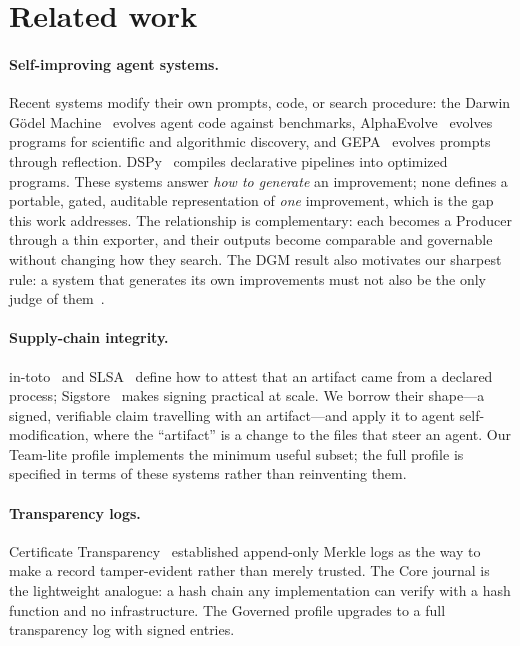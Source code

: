 \documentclass[10pt,twocolumn]{article}
\begin{document}
\section{Related work}
\label{sec:related}

\paragraph{Self-improving agent systems.} Recent systems modify their own
prompts, code, or search procedure: the Darwin G\"odel
Machine~\cite{dgm} evolves agent code against benchmarks,
AlphaEvolve~\cite{alphaevolve} evolves programs for scientific and
algorithmic discovery, and GEPA~\cite{gepa} evolves prompts through
reflection. DSPy~\cite{dspy} compiles declarative pipelines into optimized
programs. These systems answer \emph{how to generate} an improvement; none
defines a portable, gated, auditable representation of \emph{one}
improvement, which is the gap this work addresses. The relationship is
complementary: each becomes a Producer through a thin exporter, and their
outputs become comparable and governable without changing how they search.
The DGM result also motivates our sharpest rule: a system that generates
its own improvements must not also be the only judge of them~\cite{dgm}.

\paragraph{Supply-chain integrity.} in-toto~\cite{intoto} and
SLSA~\cite{slsa} define how to attest that an artifact came from a
declared process; Sigstore~\cite{sigstore} makes signing practical at
scale. We borrow their shape---a signed, verifiable claim travelling with
an artifact---and apply it to agent self-modification, where the
``artifact'' is a change to the files that steer an agent. Our Team-lite
profile implements the minimum useful subset; the full profile is
specified in terms of these systems rather than reinventing them.

\paragraph{Transparency logs.} Certificate Transparency~\cite{rfc6962}
established append-only Merkle logs as the way to make a record
tamper-evident rather than merely trusted. The Core journal is the
lightweight analogue: a hash chain any implementation can verify with a
hash function and no infrastructure. The Governed profile upgrades to a
full transparency log with signed entries.
\end{document}
